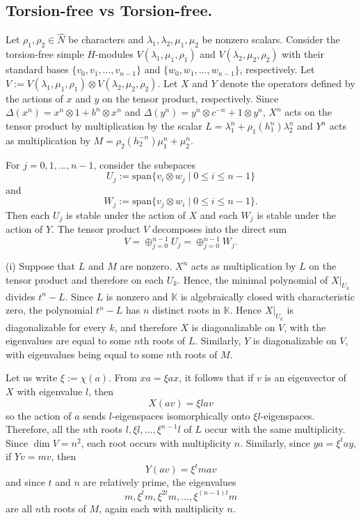 \documentclass[11pt, twoside]{amsart}
\theoremstyle{definition}
\begin{document}
\subsection{Torsion-free vs Torsion-free.}
%
Let $\rho_1, \rho_2 \in \widehat{N}$ be characters and $\lambda_1, \lambda_2, \mu_1, \mu_2$ be nonzero scalars. Consider the torsion-free simple $H$-modules $V(\lambda_1,  \mu_1, \rho_1)$ and $V(\lambda_2, \mu_2, \rho_2)$ with their standard bases $\{v_0, v_1, \ldots, v_{n-1}\}$ and $\{w_0, w_1, \ldots, w_{n-1}\}$, respectively. Let $V := V(\lambda_1, \mu_1, \rho_1) \otimes V(\lambda_2, \mu_2, \rho_2)$. Let $X$ and $Y$ denote the operators defined by the actions of $x$ and $y$ on the tensor product, respectively. Since $\Delta(x^n) = x^n \otimes 1 + b^n \otimes x^n$ and $\Delta(y^n) = y^n \otimes c^{-n} + 1 \otimes y^n$, $X^n$ acts on the tensor product by multiplication by the scalar $L = \lambda_{1}^{n} + \rho_1(h_{1}^n)\lambda_{2}^{n}$ and $Y^n$ acts as multiplication by $M = \rho_2 (h_{2}^{-n})\mu_{1}^{n} + \mu_{2}^n$. 


For $j = 0, 1, \ldots, n-1$, consider the subspaces 
%
\[U_j := \text{span}\{v_i \otimes w_j \mid 0 \le i \le n-1\}\]
%
and
%
\[W_j := \text{span}\{v_j \otimes w_i \mid 0 \le i \le n-1\}.\]
%
Then each $U_j$ is stable under the action of $X$ and each $W_j$ is stable under the action of $Y$. The tensor product $V$ decomposes into the direct sum 
%
\[V = \oplus_{j=0}^{n-1} U_j = \oplus_{j=0}^{n-1}W_j.\]
%

(i) Suppose that $L$ and $M$ are nonzero. $X^n$ acts as multiplication by $L$ on the tensor product and therefore on each $U_k$. Hence, the minimal polynomial of $X|_{U_k}$ divides $t^n - L$. Since $L$ is nonzero and $\mathbb{K}$ is algebraically closed with characteristic zero, the polynomial $t^n - L$ has $n$ distinct roots in $\mathbb{K}$. Hence $X|_{U_k}$ is diagonalizable for every $k$, and therefore $X$ is diagonalizable on $V$, with the eigenvalues are equal to some $n$th roots of $L$. Similarly, $Y$ is diagonalizable on $V$, with eigenvalues being equal to some $n$th roots of $M$.

Let us write $\xi:= \chi(a)$. From $xa = \xi ax$, it follows that if $v$ is an eigenvector of $X$ with eigenvalue $l$, then 
%
\[X(av) = \xi lav\]
%
so the action of $a$ sends $l$-eigenspaces isomorphically onto $\xi l$-eigenspaces. Therefore, all the $n$th roots $l, \xi l, \ldots, \xi^{n-1}l$ of $L$ occur with the same multiplicity. Since $\dim V = n^2$, each root occurs with multiplicity $n$. Similarly, since $ya = \xi^t ay$, if $Yv = mv$, then 
%
\[Y(av) = \xi^t mav\]
%
and since $t$ and $n$ are relatively prime, the eigenvalues 
%
\[m, \xi^t m, \xi^{2t}m, \ldots, \xi^{(n-1)t}m \]
%
are all $n$th roots of $M$, again each with multiplicity $n$.
\end{document}
